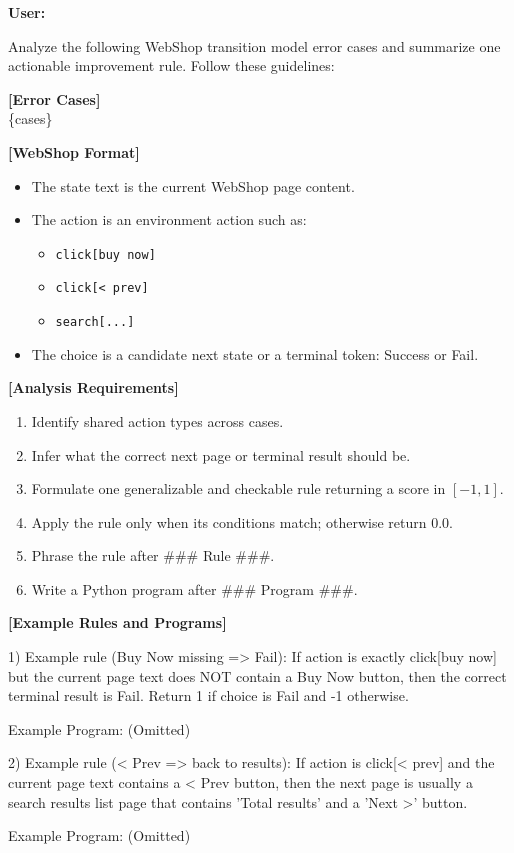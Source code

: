 \documentclass{article}
\theoremstyle{plain}
\theoremstyle{definition}
\theoremstyle{remark}
\begin{document}
\begin{tcolorbox}[
  title=Rule induction for Webshop,
  colback=gray!5,
  colframe=black!50,
  fonttitle=\bfseries,
  breakable
]
\textbf{User:}

Analyze the following WebShop transition model error cases and summarize one actionable improvement rule. Follow these guidelines:

\textbf{[Error Cases]} \\
\{cases\}

\textbf{[WebShop Format]}
\begin{itemize}
  \item The state text is the current WebShop page content.
  \item The action is an environment action such as:
  \begin{itemize}
    \item \texttt{click[buy now]}
    \item \texttt{click[< prev]}
    \item \texttt{search[...]}
  \end{itemize}
  \item The choice is a candidate next state or a terminal token: Success or Fail.
\end{itemize}

\textbf{[Analysis Requirements]}
\begin{enumerate}
  \item Identify shared action types across cases.
  \item Infer what the correct next page or terminal result should be.
  \item Formulate one generalizable and checkable rule returning a score in $[-1,1]$.
  \item Apply the rule only when its conditions match; otherwise return 0.0.
  \item Phrase the rule after \#\#\# Rule \#\#\#.
  \item Write a Python program after \#\#\# Program \#\#\#.
\end{enumerate}

\textbf{[Example Rules and Programs]}

1) Example rule (Buy Now missing => Fail): If action is exactly click[buy now] but the current page text does NOT contain a Buy Now button,
   then the correct terminal result is Fail. Return 1 if choice is Fail and -1 otherwise.

Example Program: (Omitted)

2) Example rule (< Prev => back to results): If action is click[< prev] and the current page text contains a < Prev button,
   then the next page is usually a search results list page that contains 'Total results' and a 'Next >' button.

Example Program: (Omitted)
\end{tcolorbox}
\end{document}
